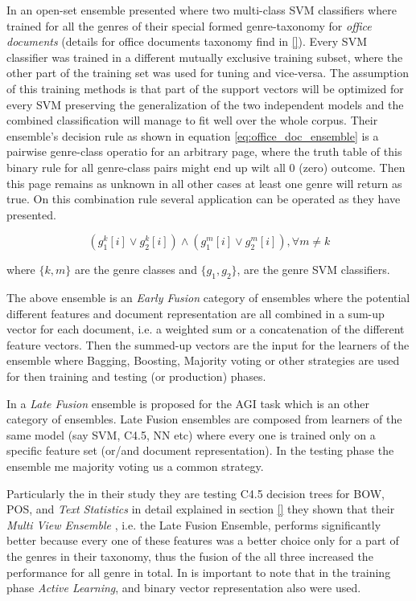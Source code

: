 In \parencite{chen2012genre} an open-set ensemble presented where two multi-class SVM classifiers where trained for all the genres of their special formed genre-taxonomy for \textit{office documents} (details for office documents taxonomy find in \ref{}). Every SVM classifier was trained in a different mutually exclusive training subset, where the other part of the training set was used for tuning and vice-versa. The assumption of this training methods is that part of the support vectors  will be optimized for every SVM preserving the generalization of the two independent models and the combined classification will manage to fit well over the whole corpus. Their ensemble's decision rule as shown in equation \ref{eq:office_doc_ensemble} is a pairwise genre-class operatio for an arbitrary page, where the truth table of this binary rule for all genre-class pairs might end up wilt all $0$ (zero) outcome. Then this page remains as unknown in all other cases at least one genre will return as true. On this combination rule several application can be operated as they have presented.

\begin{equation}\label{eq:office_doc_ensemble}
	(g^{k}_{1}[i] \vee g^{k}_{2}[i])  \wedge  (g^{m}_{1}[i] \vee g^{m}_{2}[i]) ,   \forall m \neq k
\end{equation}

where $\{k, m\}$ are the genre classes and $\{g_{1}, g_{2}\}$, are the genre SVM classifiers.
		
The above ensemble is an \textit{Early Fusion} category of ensembles where the potential different features and document representation are all combined in a sum-up vector for each document, i.e. a weighted sum or a concatenation of the different feature vectors. Then the summed-up vectors are the input for the learners of the ensemble where Bagging, Boosting, Majority voting or other strategies are used for then training and testing (or production) phases.

In \parencite{finn2006learning} a \textit{Late Fusion} ensemble is proposed for the AGI task which is an other category of ensembles. Late Fusion ensembles are composed from learners of the same model (say SVM, C4.5, NN etc) where every one is trained only on a specific feature set (or/and document representation). In the testing phase the ensemble me majority voting us a common strategy. 

Particularly the in their study they are testing C4.5 decision trees for BOW, POS, and \textit{Text Statistics} in detail explained in  section \ref{} they shown that their \textit{Multi View Ensemble }, i.e. the Late Fusion Ensemble, performs significantly better because every one of these features was a better choice only for a part of the genres in their taxonomy, thus the fusion of the all three increased the performance for all genre in total. In is important to note that in the training phase \textit{Active Learning}, and binary vector representation also were used. 

